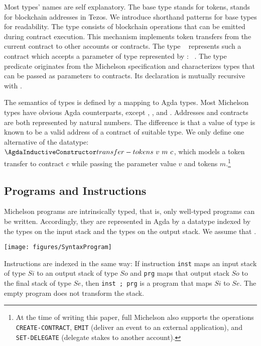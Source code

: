 Most types' names are self explanatory. The base type {\ABmutez} stands
for tokens, {\Aaddr} stands for blockchain addresses in  Tezos. We introduce
shorthand patterns for base types for readability.
The type {\Aoperation} consists of blockchain operations that can
be emitted during contract execution. This mechanism implements token
transfers from the current contract to other accounts or contracts.
The type {\Acontract~\AP} represents such a contract
which accepts a parameter of type {\Aty} represented by {\AP : \APassable~\Aty}.
The type predicate {\TypesPassable} originates from the Michelson
specification and characterizes types that can be passed as parameters
to contracts. Its declaration is mutually recursive with {\AType}.

The semantics of types is defined by a mapping to Agda types. Most
Michelson types have  obvious Agda counterparts, except {\Aaddr},
{\Acontract}, and {\Aoperation}.  Addresses and contracts are both
represented by natural numbers. The difference is that a value of type
{\Acontract} is known to be a valid address of a contract of suitable
type. We only define one alternative of the 
{\AOperation} datatype: {$\AtransferTokens~v~m~c$}, which models a
token transfer to contract $c$ while passing the parameter value $v$
and tokens $m$.\footnote{At the time of writing this paper, full Michelson also
  supports the operations \texttt{CREATE-CONTRACT}, \texttt{EMIT}
  (deliver an event to an external application), and
  \texttt{SET-DELEGATE} (delegate stakes to another account).}

\subsection{Programs and Instructions}
\label{sec:michelson-programs}


Michelson programs are intrinsically typed, that is, only well-typed
programs can be written. Accordingly, they are represented in
Agda by a datatype {\AProgram} indexed by the types on the input stack
and the types on the output stack. We assume that \TypesStack.
\begin{flushleft}
  \texttt{[image: figures/SyntaxProgram]}
\end{flushleft}

Instructions are indexed in the same way:
If  instruction \verb/inst/ maps an input stack of type $Si$ to an
output stack of type $So$
and \verb/prg/ maps that output stack $So$ to the final stack of type $Se$,
then \verb/inst ; prg/ is a program that maps $Si$ to $Se$.
The empty program {\Aend} does not transform the stack.

